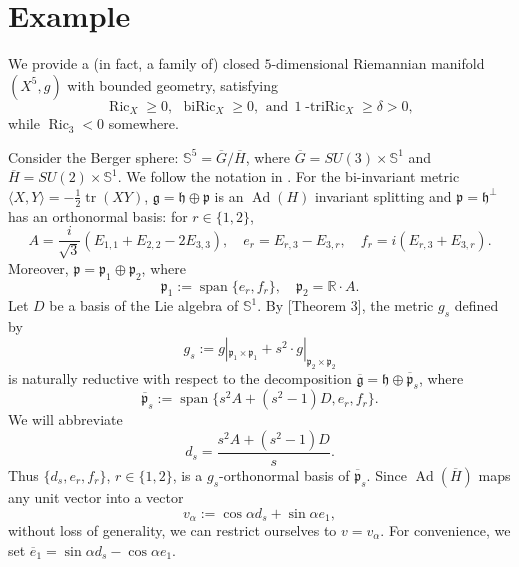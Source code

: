 \documentclass[11pt,letterpaper]{amsart}
\DeclareMathOperator{\tr}{tr}
\DeclareMathOperator{\Ric}{Ric}
\DeclareMathOperator{\biRic}{biRic}
\DeclareMathOperator{\Ad}{Ad}
\DeclareMathOperator{\vspan}{span}
\newcommand{\oG}{\overline{G}}
\newcommand{\oH}{\overline{H}}
\newcommand{\ove}{\overline{e}}
\newcommand{\lp}{\langle}
\newcommand{\rp}{\rangle}
\newcommand{\kg}{\mathfrak{g}}
\newcommand{\kh}{\mathfrak{h}}
\newcommand{\kp}{\mathfrak{p}}
\newcommand{\bR}{\mathbb{R}}
\newcommand{\bS}{\mathbb{S}}
\theoremstyle{definition}
\theoremstyle{remark}
\numberwithin{equation}{section}
\begin{document}







   
    




\appendix
\section{Example}
We provide a (in fact, a family of) closed $5$-dimensional Riemannian manifold $(X^5,g)$ with bounded geometry, satisfying
    \[\operatorname{Ric}_X\geq 0,\ \, \biRic_X\geq 0,\ \, \text{and}\ \ 1\operatorname{-triRic}_X\geq \delta>0, \] while $\Ric_3<0$ somewhere. 

Consider the Berger sphere: $\bS^5=\oG/\oH$, where $\oG=SU(3)\times \bS^1$ and $\oH=SU(2)\times \bS^1$. We follow the notation in \cite{Ziller-Bergersphere}. For the bi-invariant metric $\lp X,Y\rp=-\frac{1}{2}\tr (XY)$, $\kg=\kh\oplus\kp$ is an $\Ad(H)$ invariant splitting and $\kp=\kh^{\perp}$ has an orthonormal basis: for $r\in\{1,2\}$,
\begin{equation*}
    A=\frac{i}{\sqrt{3}}\left(E_{1,1}+E_{2,2}-2E_{3,3}\right),\quad e_r=E_{r,3}-E_{3,r}, \quad f_r=i\left(E_{r,3}+E_{3,r}\right).
\end{equation*}
Moreover, $\kp=\kp_1\oplus \kp_2$, where
\begin{equation*}
    \kp_1:=\vspan \{e_r,f_r\}, \quad \kp_2=\bR\cdot A.
\end{equation*}
Let $D$ be a basis of the Lie algebra of $\bS^1$. By \cite{Ziller-Bergersphere}[Theorem 3], the metric $g_s$ defined by
\begin{equation*}
    g_s:=g|_{\kp_1\times\kp_1}+s^2\cdot g|_{\kp_2\times\kp_2}
\end{equation*}
is naturally reductive with respect to the decomposition $\overline{\kg}=\kh\oplus \overline{\kp}_s$, where
\begin{equation*}
    \overline{\kp}_s:=\vspan \{s^2A+(s^2-1)D, e_r,f_r\}.
\end{equation*}
We will abbreviate
\begin{equation*}
    d_s=\frac{s^2A+(s^2-1)D}{s}.
\end{equation*}
Thus $\{d_s, e_r, f_r\}$, $r\in\{1,2\}$, is a $g_s$-orthonormal basis of $\overline{\kp}_s$. Since $\Ad(\oH)$ maps any unit vector into a vector
\begin{equation*}
    v_{\alpha}:=\cos \alpha d_s+\sin \alpha e_1,
\end{equation*}
without loss of generality, we can restrict ourselves to $v=v_{\alpha}$. For convenience, we set $\ove_1=\sin \alpha d_s-\cos \alpha e_1$.
\end{document}
